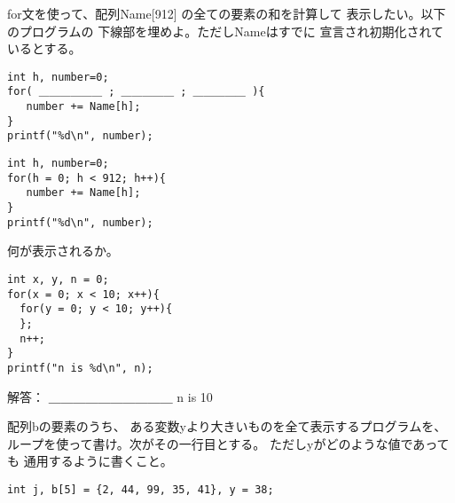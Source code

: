 \documentclass[a4j]{jarticle}
\def\ans#1#2{
\ifnum \anss=1
#1
\else
#2
\fi
}
\newcounter{toi}
\def\toi{%
\bigskip\bigskip\noindent
\raisebox{-1.2ex}{
\shadowbox{\bfseries\large 問題\thetoi}
}
\addtocounter{toi}{1}
}
\begin{document}
\begin{multicols*}{2}
%
%



\toi
for文を使って、配列{\ttfamily Name[912]}
の全ての要素の和を計算して
表示したい。以下のプログラムの
下線部を埋めよ。ただし{\ttfamily Name}はすでに
宣言され初期化されているとする。

\ifnum {}
\begin{verbatim}
int h, number=0;
for( ＿＿＿＿＿＿ ; ＿＿＿＿＿ ; ＿＿＿＿＿ ){
   number += Name[h];
}
printf("%d\n", number);
\end{verbatim}
\else
\begin{verbatim}
int h, number=0;
for(h = 0; h < 912; h++){
   number += Name[h];
}
printf("%d\n", number);
\end{verbatim}
\fi







\toi
何が表示されるか。
\begin{verbatim}
int x, y, n = 0;
for(x = 0; x < 10; x++){
  for(y = 0; y < 10; y++){
  };
  n++;
}
printf("n is %d\n", n);

\end{verbatim}
解答：\ans{＿＿＿＿＿＿＿＿＿＿}{{\ttfamily n is 10}}



\pagebreak





\toi
配列{\ttfamily b}の要素のうち、
ある変数{\ttfamily y}より大きいものを全て表示するプログラムを、
ループを使って書け。次がその一行目とする。
ただし{\ttfamily y}がどのような値であっても
通用するように書くこと。
\ifnum {}
\begin{verbatim}
int j, b[5] = {2, 44, 99, 35, 41}, y = 38;















\end{verbatim}
\end{multicols*}
\end{document}
